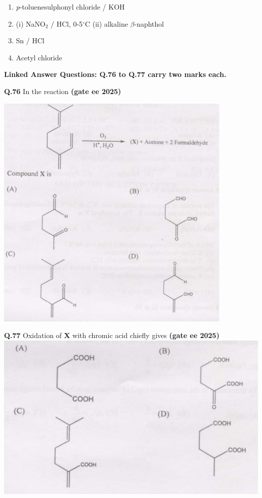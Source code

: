 \documentclass[journal,12pt,onecolumn]{exam}
\theoremstyle{remark}
\begin{document}
\begin{multicols}{2}
\begin{enumerate}[label=(\Alph*)]
\item \textit{p}-toluenesulphonyl chloride / KOH
\item (i) NaNO$_2$ / HCl, 0-5$^\circ$C \quad (ii) alkaline $\beta$-naphthol
\item Sn / HCl
\item Acetyl chloride
\end{enumerate}
\end{multicols}

\noindent \textbf{Linked Answer Questions: Q.76 to Q.77 carry two marks each.}

\noindent \textbf{Q.76} In the reaction \hfill{\textbf{(gate ee 2025)}}

\includegraphics[scale=1.2]{images/image14.png}
\vspace{0.5cm}

\noindent \textbf{Q.77} Oxidation of \textbf{X} with chromic acid chiefly gives 
 \hfill{\textbf{(gate ee 2025)}}
 \includegraphics[width=15cm]{images/image15.png} 
 \vspace{1cm}
\end{document}
